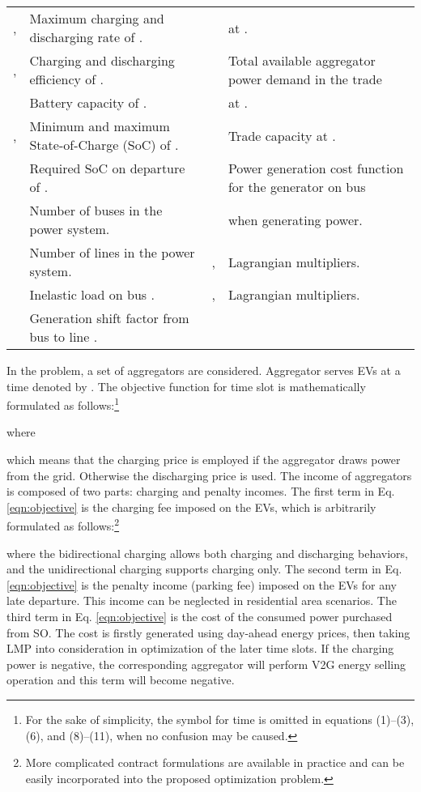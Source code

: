 \documentclass[conference]{IEEEtran}
\begin{document}
\begin{table*}
\begin{tabular}{l|l||l|l}
			, & Maximum charging and discharging rate of . & & at . \\
			, & Charging and discharging efficiency of . &  & Total available aggregator power demand in the trade \\
			 & Battery capacity of . & & at .\\
			, & Minimum and maximum State-of-Charge (SoC) of . &  & Trade capacity at . \\
			 & Required SoC on departure of . &  & Power generation cost function for the generator on bus \\
			 & Number of buses in the power system. & &  when generating  power. \\
			 & Number of lines in the power system. & , & Lagrangian multipliers.\\
			 & Inelastic load on bus . & , & Lagrangian multipliers.\\
			 & Generation shift factor from bus  to line . & & \\
			
\hline
		\end{tabular}
	\end{table*}
	


	In the problem, a set of  aggregators  are considered. Aggregator  serves  EVs at a time denoted by . The objective function for time slot  is mathematically formulated as follows:\footnote{For the sake of simplicity, the symbol  for time is omitted in equations (1)--(3), (6), and (8)--(11), when no confusion may be caused.}
    
    \vspace{-0.5cm}
	{\small
    }where

which means that the charging price is employed if the aggregator draws power from the grid. Otherwise the discharging price is used. The income of aggregators is composed of two parts: charging and penalty incomes. The first term in Eq. \eqref{eqn:objective} is the charging fee imposed on the EVs, which is arbitrarily formulated as follows:\footnote{More complicated contract formulations are available in practice and can be easily incorporated into the proposed optimization problem.}

\vspace{-0.4cm}
{\small
}

\vspace{-0.4cm}
\noindent where the bidirectional charging allows both charging and discharging behaviors, and the unidirectional charging supports charging only. The second term in Eq. \eqref{eqn:objective} is the penalty income (parking fee) imposed on the EVs for any late departure. This income can be neglected in residential area scenarios. The third term in Eq. \eqref{eqn:objective} is the cost of the consumed power purchased from SO. The cost is firstly generated using day-ahead energy prices, then taking LMP into consideration in optimization of the later time slots. If the charging power is negative, the corresponding aggregator will perform V2G energy selling operation and this term will become negative.
	
\end{document}
